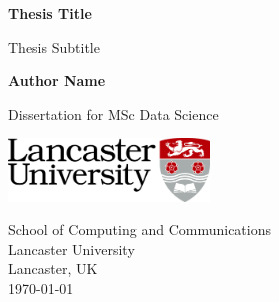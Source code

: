 \begin{titlepage}
   \begin{center}
       \vspace*{1cm}
 
       \Huge{\textbf{Thesis Title}}
 
       \vspace{0.5cm}
       \Large{Thesis Subtitle}
 
       \vspace{1.5cm}
 
       \Large{\textbf{Author Name}}
 
       \vfill
 
       Dissertation for MSc Data Science
 
       \vspace{0.8cm}
 
       \includegraphics[width=0.4\textwidth]{img/lu-logo-cmyk.jpg}
 
       School of Computing and Communications\\
       Lancaster University\\
       Lancaster, UK\\
       \today
 
   \end{center}
\end{titlepage}

\thispagestyle{empty}